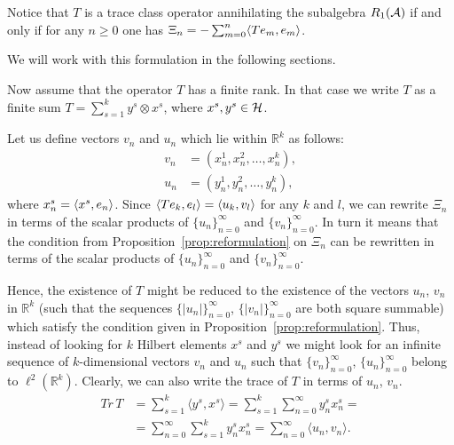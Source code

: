 \documentclass[12pt]{amsart}
\theoremstyle{case}
\begin{document}
  \begin{prop}
    \label{prop:reformulation}
    Notice that $T$ is a trace class operator annihilating the subalgebra $R_1(\cal{A})$ if and only if
      for any $n \geq 0$ one has $\Xi_n = -\sum_{m=0}^n \inner{Te_m}{e_m}$.
  \end{prop}
    We will work with this formulation in the following sections.

  Now assume that the operator $T$ has a finite rank.
  In that case we write $T$ as a finite sum $T = \sum_{s=1}^k y^s \otimes x^s$,
    where $x^s, y^s \in \cal{H}$.

  Let us define vectors $v_n$ and $u_n$ which lie within $\mathbb{R}^k$ as follows:
  \begin{align*}
    v_n &= (x^1_n, x^2_n, \dots, x^k_n),\\
    u_n &= (y^1_n, y^2_n, \dots, y^k_n),
  \end{align*}
  where $x^s_n = \inner{x^s}{e_n}$.
  Since $\inner{Te_k}{e_l} = \inner{u_k}{v_l}$ for any $k$ and $l$, we can rewrite $\Xi_n$ in terms of
    the scalar products of $\{u_n\}_{n=0}^\infty$ and $\{v_n\}_{n=0}^\infty$.
  In turn it means that the condition from Proposition~\ref{prop:reformulation} on $\Xi_n$
    can be rewritten in terms of the scalar products of $\{u_n\}_{n=0}^\infty$ and $\{v_n\}_{n=0}^\infty$.

  Hence, the existence of $T$ might be reduced to the existence of
    the vectors $u_n$, $v_n$ in $\mathbb{R}^k$ (such that the sequences $\{\lvert u_n\rvert\}_{n=0}^\infty$,
    $\{\lvert v_n\rvert\}_{n=0}^\infty$ are both square summable) which satisfy the condition given in Proposition~\ref{prop:reformulation}.
  Thus, instead of looking for $k$ Hilbert elements $x^s$ and $y^s$ we might look for an infinite sequence
    of $k$-dimensional vectors $v_n$ and $u_n$ such that $\{v_n \}_{n=0}^\infty$, $\{u_n\}_{n=0}^\infty$ belong to $\ell^2(\mathbb{R}^k)$.
  Clearly, we can also write the trace of $T$ in terms of $u_n$, $v_n$.
  \begin{align*}
    Tr\,T &= \sum_{s=1}^k \langle y^s, x^s \rangle = \sum_{s=1}^k \sum_{n=0}^\infty y^s_n x^s_n =\\
         &= \sum_{n=0}^\infty \sum_{s=1}^k y^s_n x^s_n = \sum_{n=0}^\infty \langle u_n, v_n \rangle.
  \end{align*}
\end{document}
